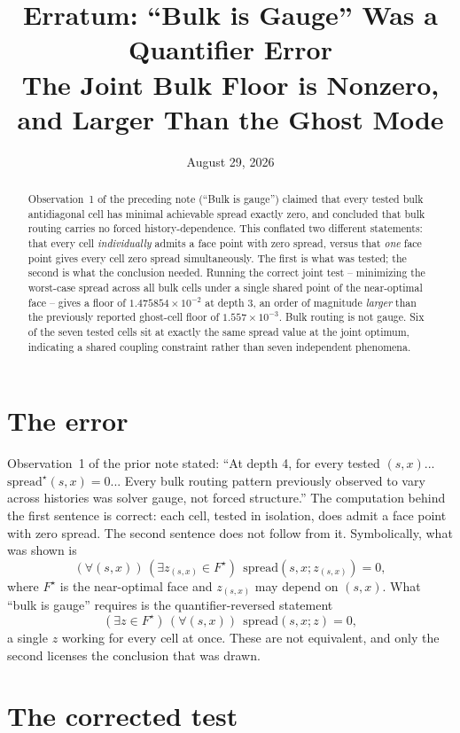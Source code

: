 \documentclass[11pt,a4paper]{article}
\title{\textbf{Erratum: ``Bulk is Gauge'' Was a Quantifier Error}\\
\large The Joint Bulk Floor is Nonzero, and Larger Than the Ghost Mode}
\author{}
\date{August 29, 2026}
\begin{document}
\maketitle

\begin{abstract}
Observation~1 of the preceding note (``Bulk is gauge'') claimed that every
tested bulk antidiagonal cell has minimal achievable spread exactly zero,
and concluded that bulk routing carries no forced history-dependence. This
conflated two different statements: that every cell \emph{individually}
admits a face point with zero spread, versus that \emph{one} face point
gives every cell zero spread simultaneously. The first is what was tested;
the second is what the conclusion needed. Running the correct joint test --
minimizing the worst-case spread across all bulk cells under a single
shared point of the near-optimal face -- gives a floor of
$1.475854\times10^{-2}$ at depth 3, an order of magnitude \emph{larger}
than the previously reported ghost-cell floor of $1.557\times10^{-3}$.
Bulk routing is not gauge. Six of the seven tested cells sit at exactly the
same spread value at the joint optimum, indicating a shared coupling
constraint rather than seven independent phenomena.
\end{abstract}

\section{The error}

Observation~1 of the prior note stated: ``At depth 4, for every tested
$(s,x)$... $\mathrm{spread}^\star(s,x)=0$... Every bulk routing pattern
previously observed to vary across histories was solver gauge, not forced
structure.'' The computation behind the first sentence is correct: each
cell, tested in isolation, does admit a face point with zero spread. The
second sentence does not follow from it. Symbolically, what was shown is
\[
(\forall (s,x))\,(\exists z_{(s,x)}\in F^\star)\ \ \mathrm{spread}(s,x;z_{(s,x)})=0,
\]
where $F^\star$ is the near-optimal face and $z_{(s,x)}$ may depend on
$(s,x)$. What ``bulk is gauge'' requires is the quantifier-reversed
statement
\[
(\exists z\in F^\star)\,(\forall (s,x))\ \ \mathrm{spread}(s,x;z)=0,
\]
a single $z$ working for every cell at once. These are not equivalent, and
only the second licenses the conclusion that was drawn.

\section{The corrected test}
\end{document}
